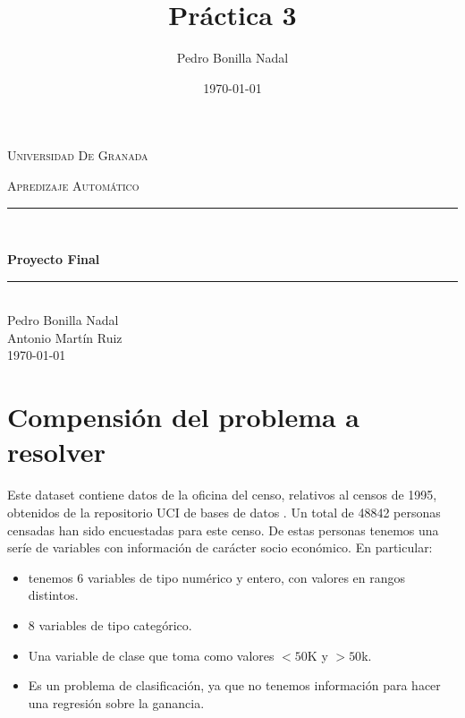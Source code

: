 \documentclass[11pt,a4paper]{article}
\title{Práctica 3}
\author{Pedro Bonilla Nadal}
\date{\today}
\begin{document}
\begin{titlepage}
\begin{center}

\vspace*{.06\textheight}
{\scshape\LARGE Universidad De Granada\par}\vspace{1.5cm} %
\textsc{\Large Apredizaje Automático}\\[0.5cm] %

\rule{\textwidth}{0.4mm} \\[0.4cm] %
{\huge \bfseries Proyecto Final\par}\vspace{0.4cm} %

\rule{\textwidth}{0.4mm} \\[11.5cm] %
 {\Large Pedro Bonilla Nadal\\Antonio Martín Ruiz}\\[1cm]
 
 {\today}

\vfill
\end{center}
\end{titlepage}

\setcounter{tocdepth}{2}
\tableofcontents
\newpage



\section{Compensión del problema a resolver }

Este dataset contiene datos de la oficina del censo\cite{census}, relativos al censos de 1995, obtenidos de la repositorio UCI de bases de datos \cite{uci}. Un total de 48842 personas censadas han sido encuestadas para este censo.  De estas personas tenemos una seríe de variables con información de carácter socio económico. En particular:
\begin{itemize}
\item tenemos 6 variables de tipo numérico y entero, con valores en rangos distintos.
\item 8 variables de tipo categórico.
\item Una variable de clase que toma como valores $<50$K y $>50$k.
\item Es un problema de clasificación, ya que no tenemos información para hacer una regresión sobre la ganancia. 
\end{itemize}
\end{document}
